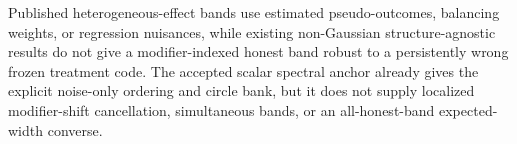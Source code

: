 Published heterogeneous-effect bands use estimated pseudo-outcomes, balancing weights, or regression nuisances, while existing non-Gaussian structure-agnostic results do not give a modifier-indexed honest band robust to a persistently wrong frozen treatment code.  The accepted scalar spectral anchor already gives the explicit noise-only ordering and circle bank, but it does not supply localized modifier-shift cancellation, simultaneous bands, or an all-honest-band expected-width converse.